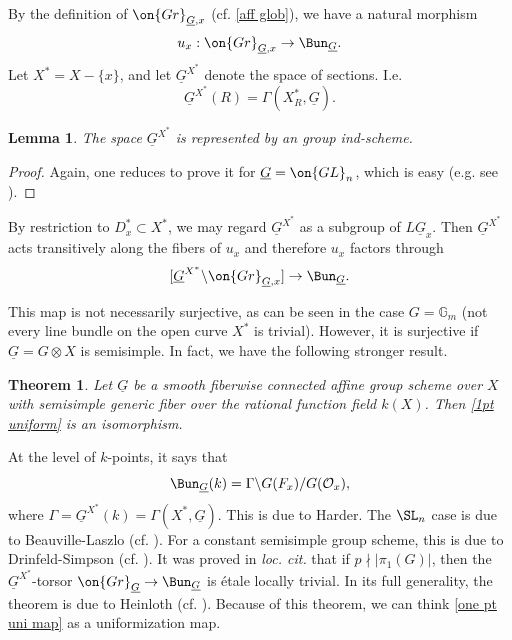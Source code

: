 \documentclass[]{pcmi}
\theoremstyle{plain}
\newtheorem{thm}[equation]{Theorem}
\newtheorem{lem}[equation]{Lemma}
\theoremstyle{remark}
\theoremstyle{definition}
\newcommand{\bG}{{\mathbb G}}
\newcommand{\mO}{{\mathcal O}}
\newcommand{\Gr}{{\on{Gr}}}
\newcommand{\GL}{{\on{GL}}}
\begin{document}
By the definition of $\Gr_{\underline G,x}$ (cf. \eqref{aff glob}), we have a natural morphism
\begin{equation}\label{one pt uni map}
u_x: \Gr_{\underline G,x}\to \Bun_{\underline G}.
\end{equation}
Let $X^*=X-\{x\}$, and let $\underline G^{X^*}$ denote the space of sections. I.e. 
\begin{equation}\label{Gout}
\underline G^{X^*}(R)=\Gamma(X_R^*,\underline G).
\end{equation}
\begin{lem}\label{rep of Gout}
The space $\underline G^{X^*}$ is represented by an group ind-scheme.
\end{lem}
\begin{proof}Again, one reduces to prove it for $\underline G=\GL_n$, which is easy (e.g. see \cite[(1.9)]{BL}).
\end{proof}
 By restriction to $D_x^*\subset X^*$, we may regard $\underline G^{X^*}$ as a subgroup of $L\underline G_x$. 
Then $\underline G^{X^*}$ acts transitively along the fibers of $u_x$ and therefore $u_x$ factors through
\begin{equation}\label{1pt uniform}
[\underline G^{X^*}\backslash\Gr_{\underline G,x}]\to \Bun_{\underline G}.
\end{equation}

This map is not necessarily surjective, as can be seen in the case $G=\bG_m$ (not every line bundle on the open curve $X^*$ is trivial). However, it is surjective if $\underline G=G\otimes X$ is semisimple. In fact, we have the following stronger result.
\begin{thm}
Let $\underline G$ be a smooth fiberwise connected affine group scheme over $X$
with semisimple generic fiber  over the rational function field $k(X)$. Then \eqref{1pt uniform} is an isomorphism.
\end{thm}



At the level of $k$-points, it says that 
$$\Bun_{\underline G}(k)= \Gamma\backslash G(F_x)/G(\mO_x),$$ where $\Gamma=\underline G^{X^*}(k)=\Gamma(X^*,\underline G)$. This is due to Harder. 
The $\SL_n$ case is due to Beauville-Laszlo (cf. \cite{BL}). 
For a constant semisimple group scheme, this is due to Drinfeld-Simpson (cf. \cite{DS}). It was proved in \emph{loc. cit.} that if $p\nmid|\pi_1(G)|$, then the $\underline G^{X^*}$-torsor $\Gr_{\underline G}\to \Bun_{\underline G}$ is \'etale locally trivial. In its full generality, the theorem is due to Heinloth (cf. \cite{He}).
Because of this theorem, we can think \eqref{one pt uni map} as a uniformization map.
\end{document}

